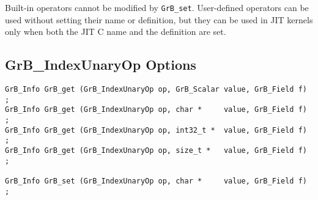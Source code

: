 Built-in operators cannot be modified by \verb'GrB_set'.  User-defined
operators can be used without setting their name or definition, but they can be
used in JIT kernels only when both the JIT C name and the definition are set.

\newpage
\subsection{{\sf GrB\_IndexUnaryOp} Options}
\label{get_set_idxunop}

\begin{mdframed}[userdefinedwidth=6in]
{\footnotesize
\begin{verbatim}
GrB_Info GrB_get (GrB_IndexUnaryOp op, GrB_Scalar value, GrB_Field f) ;
GrB_Info GrB_get (GrB_IndexUnaryOp op, char *     value, GrB_Field f) ;
GrB_Info GrB_get (GrB_IndexUnaryOp op, int32_t *  value, GrB_Field f) ;
GrB_Info GrB_get (GrB_IndexUnaryOp op, size_t *   value, GrB_Field f) ;

GrB_Info GrB_set (GrB_IndexUnaryOp op, char *     value, GrB_Field f) ;
\end{verbatim}
}\end{mdframed}


